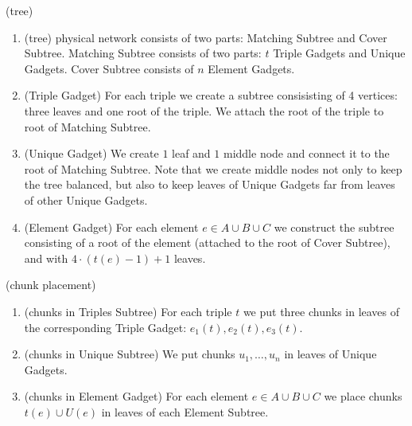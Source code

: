 (tree) 

\begin{enumerate}
\item (tree) physical network consists of two parts: Matching Subtree
  and Cover Subtree. Matching Subtree consists of two parts: $t$
  Triple Gadgets and Unique Gadgets. Cover Subtree consists of
  $n$ Element Gadgets.
\item (Triple Gadget) For each triple we create a subtree
  consisisting of 4 vertices: three leaves and one root of the
  triple. We attach the root of the triple to root of Matching
  Subtree.
\item (Unique Gadget) We create $1$ leaf and $1$ middle node and
  connect it to the root of Matching Subtree. Note that we create middle
  nodes not only to keep the tree balanced, but also to keep leaves of
  Unique Gadgets far from leaves of other Unique Gadgets.
\item (Element Gadget) For each element $e \in A\cup B\cup C$ we
  construct the subtree consisting of a root of the element (attached
  to the root of Cover Subtree), and with $4\cdot(t(e)-1)+1$
  leaves.

\end{enumerate}

(chunk placement)
\begin{enumerate}
\item (chunks in Triples Subtree) For each triple
  $t$ we put three chunks in leaves of
  the corresponding Triple Gadget: $e_1(t), e_2(t), e_3(t)$.
\item (chunks in Unique Subtree) We put chunks $u_1,\ldots, u_n$ in leaves of
  Unique Gadgets.
\item (chunks in Element Gadget) For each element $e\in A\cup B\cup C$ we place chunks
  $t(e)\cup U(e)$ in leaves of each Element Subtree.
\end{enumerate}

